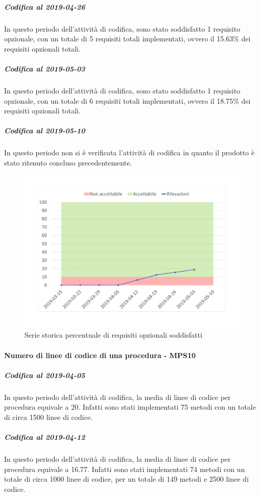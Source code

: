 \subparagraph{Codifica al 2019-04-26}
In questo periodo dell'attività di codifica, sono stato soddisfatto 1 requisito opzionale, con un totale di 5 requisiti totali implementati, ovvero il 15.63\% dei requisiti opzionali totali.

\subparagraph{Codifica al 2019-05-03}
In questo periodo dell'attività di codifica, sono stato soddisfatto 1 requisito opzionale, con un totale di 6 requisiti totali implementati, ovvero il 18.75\% dei requisiti opzionali totali.

\subparagraph{Codifica al 2019-05-10}
In questo periodo non si è verificata l'attività di codifica in quanto il prodotto è stato ritenuto concluso precedentemente.

\begin{figure}[H]
	\centering
	\includegraphics[scale=0.6]{images/resoconto/MPS9Chart.pdf}
	\caption{Serie storica percentuale di requisiti opzionali soddisfatti}	
\end{figure}

\paragraph{Numero di linee di codice di una procedura - MPS10}
\subparagraph{Codifica al 2019-04-05}
In questo periodo dell'attività di codifica, la media di linee di codice per procedura equivale a 20. Infatti sono stati implementati 75 metodi con un totale di circa 1500 linee di codice.

\subparagraph{Codifica al 2019-04-12}
In questo periodo dell'attività di codifica, la media di linee di codice per procedura equivale a 16.77. Infatti sono stati implementati 74 metodi con un totale di circa 1000 linee di codice, per un totale di 149 metodi e 2500 linee di codice.

